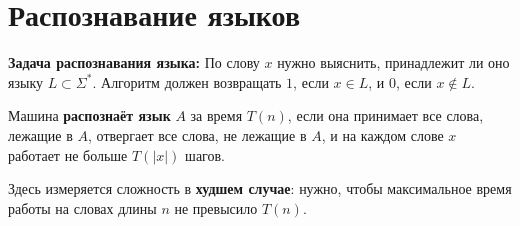 \documentclass[11pt]{article}
\begin{document}
\section{Распознавание языков}

\begin{definition}
    \textbf{Задача распознавания языка:} По слову $x$ нужно выяснить, принадлежит ли оно языку $L \subset \Sigma^*$. Алгоритм должен возвращать
    $1$, если $x \in L$, и $0$, если $x \notin L$.
\end{definition}

\begin{definition}
    Машина \textbf{распознаёт язык} $A$ за время $T(n)$, если она принимает все слова, лежащие в $A$, отвергает все слова,
    не лежащие в $A$, и на каждом слове $x$ работает не больше $T(|x|)$ шагов.
\end{definition}

\begin{remark}
    Здесь измеряется сложность в \textbf{худшем случае}: нужно, чтобы максимальное время работы на словах длины $n$ не превысило $T(n)$.
\end{remark}
\end{document}
